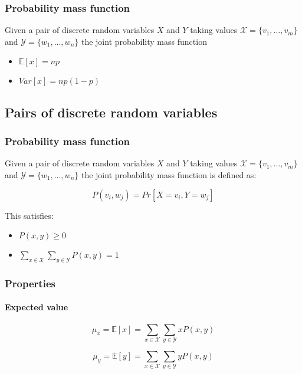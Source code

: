 		\subsubsection{Probability mass function}
		Given a pair of discrete random variables $X$ and $Y$ taking values $\mathcal{X} = \{v_1,\dots, v_m\}$ and $\mathcal{Y} = \{w_1, \dots, w_n\}$ the joint probability mass function
		\begin{multicols}{2}
			\begin{itemize}
				\item $\mathbb{E}[x] = np$
				\item $Var[x] = np(1-p)$
			\end{itemize}
		\end{multicols}

	\subsection{Pairs of discrete random variables}
	
		\subsubsection{Probability mass function}
		Given a pair of discrete random variables $X$ and $Y$ taking values $\mathcal{X} = \{v_1,\dots, v_m\}$ and $\mathcal{Y} = \{w_1, \dots, w_n\}$ the joint probability mass function is defined as:

		$$P(v_i, w_j) = Pr[X = v_i, Y = w_j]$$

		This satisfies:
		
		\begin{multicols}{2}
			\begin{itemize}
				\item $P(x,y) \ge 0$
				\item $\sum\limits_{x\in\mathcal{X}}\sum\limits_{y\in\mathcal{Y}}P(x,y) = 1$
			\end{itemize}
		\end{multicols}

		\subsubsection{Properties}

			\paragraph{Expected value}

			$$\mu_x = \mathbb{E}[x] = \sum\limits_{x\in\mathcal{X}}\sum\limits_{y\in\mathcal{Y}}xP(x,y)$$

			$$\mu_y = \mathbb{E}[y] = \sum\limits_{x\in\mathcal{X}}\sum\limits_{y\in\mathcal{Y}}yP(x,y)$$
	

